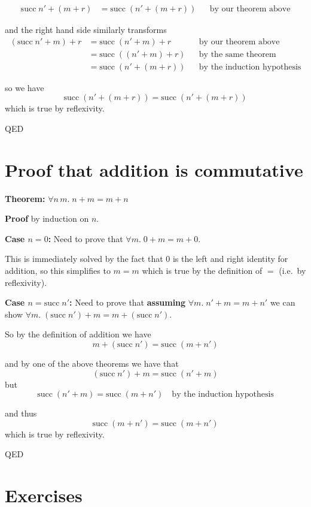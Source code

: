 \documentclass[11pt]{article}
\begin{document}
\begin{align*}
\text{succ}\; n' + (m + r) &= \text{succ}\;(n' + (m + r)) && \text{by our theorem above}
\end{align*}

and the right hand side similarly transforms
\begin{align*}
(\text{succ}\; n' + m) + r
  &= \text{succ}\;(n' + m) + r && \text{by our theorem above} \\
  &= \text{succ}\;((n' + m) + r) && \text{by the same theorem} \\
  &= \text{succ}\;(n' + (m + r)) && \text{by the induction hypothesis}
\end{align*}

so we have
\[
\text{succ}\;(n' + (m + r)) = \text{succ}\;(n' + (m + r))
\]
which is true by reflexivity.

QED

\section{Proof that addition is commutative}

\textbf{Theorem:} $\forall n\, m.\; n + m = m + n$

\textbf{Proof} by induction on $n$.

\textbf{Case $n = 0$:} Need to prove that $\forall m.\; 0 + m = m + 0$.

This is immediately solved by the fact that 0 is the left and right identity for addition, so this simplifies to $m = m$ which is true by the definition of $=$ (i.e.\ by reflexivity).

\textbf{Case $n = \text{succ}\; n'$:} Need to prove that \textbf{assuming} $\forall m.\; n' + m = m + n'$ we can show $\forall m.\; (\text{succ}\; n') + m = m + (\text{succ}\; n')$.

So by the definition of addition we have
\[
m + (\text{succ}\; n') = \text{succ}\;(m + n')
\]

and by one of the above theorems we have that
\[
(\text{succ}\; n') + m = \text{succ}\;(n' + m)
\]
but
\[
\text{succ}\;(n' + m) = \text{succ}\;(m + n') \quad \text{by the induction hypothesis}
\]

and thus
\[
\text{succ}\;(m + n') = \text{succ}\;(m + n')
\]
which is true by reflexivity.

QED

\section{Exercises}
\end{document}
